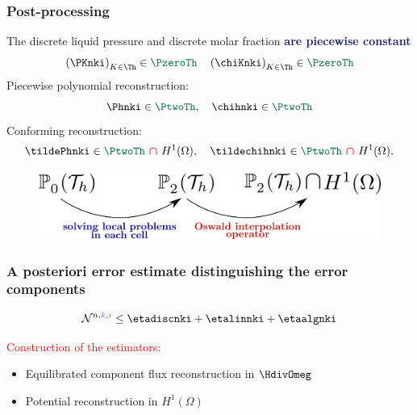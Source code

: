 \begin{frame}
  \frametitle{Post-processing}
The discrete liquid pressure and discrete molar fraction \textcolor{midnightblue}{\textbf{are piecewise constant}} 
\\
\begin{equation*}
\left(\PKnki\right)_{K \in \Th} \in \textcolor{cadmiumgreen}{\PzeroTh} \quad \left(\chiKnki\right)_{K \in \Th} \in \textcolor{cadmiumgreen}{\PzeroTh}
\end{equation*}
Piecewise polynomial reconstruction:
\begin{equation*}
\Phnki \in \textcolor{cadmiumgreen}{\PtwoTh}, \quad \chihnki \in \textcolor{cadmiumgreen}{\PtwoTh}
\end{equation*}
\vspace{-0.1 cm}
Conforming reconstruction:
\begin{equation*}
\tildePhnki \in \textcolor{cadmiumgreen}{\PtwoTh} \ \textcolor{red}{\bm \cap} \ H^1(\Omega), \quad \tildechihnki \in \textcolor{cadmiumgreen}{\PtwoTh} \ \textcolor{red}{\bm \cap} \ H^1(\Omega).
\end{equation*}
\vspace{-0.8 cm}
\begin{figure}
\centering
\includegraphics[width = 0.6 \textwidth]{fig_article_chap_3/image_oswald2}
\end{figure}
\end{frame}
\begin{frame}
\frametitle{A posteriori error estimate distinguishing the error components}

\begin{theorem}
\begin{equation*}
\mathcal{N}^{n,\kk,\ii} \leq \etadiscnki + \etalinnki + \etaalgnki
\end{equation*}
\end{theorem}
\textcolor{red}{Construction of the estimators:} 
\begin{itemize}
\item Equilibrated component flux reconstruction in $\HdivOmeg$
\item Potential reconstruction in $H^1(\Omega)$ 
\end{itemize}
\end{frame}
%


